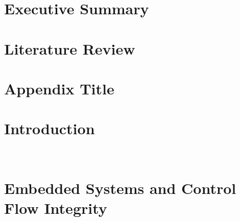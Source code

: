 \documentclass[
11pt, %
twoside, %
english, %
onehalfspacing, %
nolistspacing, %
liststotoc, %
parskip, %
headsepline, %
]{MastersDoctoralThesis} %
\author{Luke \textsc{Atherton}}
\newif\iflitreview
\newif\ifnotesincluded
\begin{document}
\frontmatter
\pagestyle{plain}



\iflitreview

\else

\fi
\ifnotesincluded

\chapter*{Acknowledgements}
Thanks everyone! Elisabeth

\fi

\tableofcontents
\lstlistoflistings
\listoffigures
\listoftables



\chapter*{Executive Summary}


\iflitreview

\chapter{Literature Review}


\appendix
\chapter{Appendix Title}

\else

\mainmatter
\pagestyle{thesis}

\chapter{Introduction}





\\


\chapter{Embedded Systems and Control Flow Integrity} \label{chapterCFI}




\end{document}
